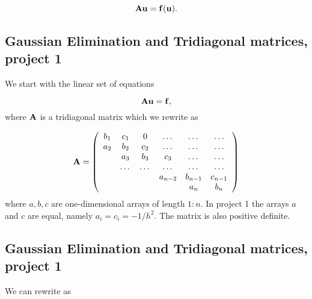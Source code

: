 \documentclass[%
twoside,                 %
final,                   %
10pt]{article}
\begin{document}
{{\[
   {\bf A}{\bf u} = {\bf f}({\bf u}).
\]

\subsection{Gaussian Elimination and Tridiagonal matrices, project 1}

We start with the linear set of equations

\[
   {\bf A}{\bf u} = {\bf f},
\]
where ${\bf A}$ is a tridiagonal matrix which we rewrite as

\[
    {\bf A} = \left(\begin{array}{cccccc}
                           b_1& c_1 & 0 &\dots   & \dots &\dots \\
                           a_2 & b_2 & c_2 &\dots &\dots &\dots \\
                           & a_3 & b_3 & c_3 & \dots & \dots \\
                           & \dots   & \dots &\dots   &\dots & \dots \\
                           &   &  &a_{n-2}  &b_{n-1}& c_{n-1} \\
                           &    &  &   &a_n & b_n \\
                      \end{array} \right)
\]
where $a,b,c$ are one-dimensional arrays of length $1:n$.
In project 1 the arrays $a$ and $c$ are equal, namely $a_i=c_i=-1/h^2$.
The matrix is  also positive definite.

\subsection{Gaussian Elimination and Tridiagonal matrices, project 1}

We can rewrite as

}}
\end{document}
